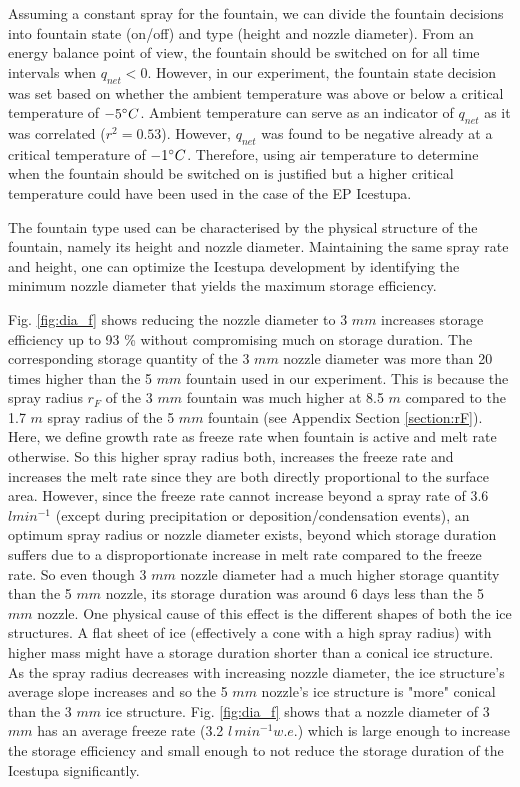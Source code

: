 \documentclass[utf8]{frontiersSCNS} %
\begin{document}
Assuming a constant spray for the fountain, we can divide the fountain decisions into fountain state (on/off) and type
(height and nozzle diameter).  From an energy balance point of view, the fountain should be switched on for all time
intervals when $q_{net} < 0$. However, in our experiment, the fountain state decision was set based on whether the
ambient temperature was above or below a critical temperature of $-5 \degree C$. Ambient temperature can serve as an
indicator of $q_{net}$ as it was correlated ($r^2 = 0.53$).  However, $q_{net}$ was found to be negative already at a
critical temperature of $-1 \degree C$. Therefore, using air temperature to determine when the fountain should be
switched on is justified but a higher critical temperature could have been used in the case of the EP
Icestupa. 

The fountain type used can be characterised by the physical structure of the fountain, namely its height and nozzle
diameter. Maintaining the same spray rate and height, one can optimize the Icestupa development by identifying the
minimum nozzle diameter that yields the maximum storage efficiency. 

Fig. \ref{fig:dia_f} shows reducing the nozzle diameter to 3 $mm$ increases storage efficiency up to 93 \% without
compromising much on storage duration.  The corresponding storage quantity of the 3 $mm$ nozzle diameter was more than
20 times higher than the 5 $mm$ fountain used in our experiment. This is because the spray radius $r_F$ of the 3 $mm$
fountain was much higher at 8.5 $m$ compared to the 1.7 $m$ spray radius of the 5 $mm$ fountain (see Appendix Section
\ref{section:rF}). Here, we define growth rate as freeze rate when fountain is active and melt rate otherwise. So this
higher spray radius both, increases the freeze rate  and increases the melt rate since they are both directly
proportional to the surface area. However, since the freeze rate cannot increase beyond a spray rate of 3.6 $l
min^{-1}$ (except during precipitation or deposition/condensation events), an optimum spray radius or nozzle diameter
exists, beyond which storage duration suffers due to a disproportionate increase in melt rate compared to the freeze
rate. So even though 3 $mm$ nozzle diameter had a much higher storage quantity than the 5 $mm$ nozzle, its storage
duration was around 6 days less than the 5 $mm$ nozzle. One physical cause of this effect is the different shapes of
both the ice structures. A flat sheet of ice (effectively a cone with a high spray radius) with higher mass might have
a storage duration shorter than a conical ice structure. As the spray radius decreases with increasing nozzle
diameter, the ice structure’s average slope increases and so the 5 $mm$ nozzle's ice structure is "more" conical than
the 3 $mm$ ice structure. Fig.  \ref{fig:dia_f} shows that a nozzle diameter of 3 $mm$ has an average freeze rate (3.2
$l \,min^{-1} w.e.$) which is large enough to increase the storage efficiency and small enough to not reduce the
storage duration of the Icestupa significantly.
\end{document}
